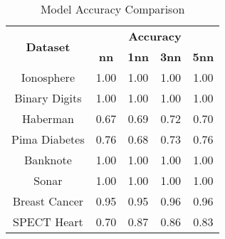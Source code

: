 \begin{table}[htbp]
\caption{Model Accuracy Comparison}
\begin{center}
\begin{tabular}{|c|c|c|c|c|}
\hline
\multirow{2}{*}{\textbf{Dataset}} & \multicolumn{4}{c|}{\textbf{Accuracy}} \\ \cline{2-5}
 & \textbf{nn} & \textbf{1nn} & \textbf{3nn} & \textbf{5nn} \\ \hline
Ionosphere & 1.00 & 1.00 & 1.00 & 1.00 \\ \hline
Binary Digits & 1.00 & 1.00 & 1.00 & 1.00 \\ \hline
Haberman & 0.67 & 0.69 & 0.72 & 0.70 \\ \hline
Pima Diabetes & 0.76 & 0.68 & 0.73 & 0.76 \\ \hline
Banknote & 1.00 & 1.00 & 1.00 & 1.00 \\ \hline
Sonar & 1.00 & 1.00 & 1.00 & 1.00 \\ \hline
Breast Cancer & 0.95 & 0.95 & 0.96 & 0.96 \\ \hline
SPECT Heart & 0.70 & 0.87 & 0.86 & 0.83 \\ \hline
\end{tabular}
\label{tab:accuracy}
\end{center}
\end{table}